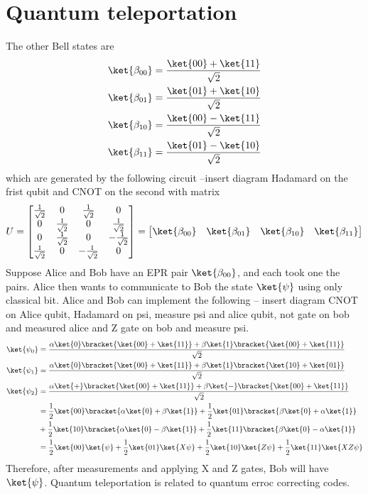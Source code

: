 \section{Quantum teleportation}
The other Bell states are 
\begin{align*}
    \ket{\beta_{00}} &= \dfrac{\ket{00} + \ket{11}}{\sqrt{2}}\\
    \ket{\beta_{01}} &= \dfrac{\ket{01} + \ket{10}}{\sqrt{2}}\\
    \ket{\beta_{10}} &= \dfrac{\ket{00} - \ket{11}}{\sqrt{2}}\\
    \ket{\beta_{11}} &= \dfrac{\ket{01} - \ket{10}}{\sqrt{2}}
\end{align*}
which are generated by the following circuit --insert diagram Hadamard on the frist qubit and CNOT on the second 
with matrix 
\begin{equation*}
    U = \begin{bmatrix}
        \frac{1}{\sqrt{2}} & 0 & \frac{1}{\sqrt{2}} & 0\\
        0 & \frac{1}{\sqrt{2}} & 0 & \frac{1}{\sqrt{2}} \\
        0 & \frac{1}{\sqrt{2}} & 0 & -\frac{1}{\sqrt{2}} \\
        \frac{1}{\sqrt{2}} & 0 & - \frac{1}{\sqrt{2}} & 0
    \end{bmatrix} = \begin{bmatrix}
        \ket{\beta_{00}} & \ket{\beta_{01}} & \ket{\beta_{10}} & \ket{\beta_{11}}
    \end{bmatrix}
\end{equation*}
Suppose Alice and Bob have an EPR pair \(\ket{\beta_{00}}\), and each took one the pairs. Alice then wants to communicate to Bob the state \(\ket{\psi}\) using only classical bit. Alice and Bob can implement the following -- insert diagram CNOT on Alice qubit, Hadamard on psi, measure psi and alice qubit, not gate on bob and measured alice and Z gate on bob and measure psi. 
\begin{align*}
    \ket{\psi_0} &= \dfrac{\alpha \ket{0} \bracket{\ket{00} + \ket{11}} +  \beta \ket{1} \bracket{\ket{00} + \ket{11}}}{\sqrt{2}}\\
    \ket{\psi_1} &= \dfrac{\alpha \ket{0} \bracket{\ket{00} + \ket{11}} +  \beta \ket{1} \bracket{\ket{10} + \ket{01}}}{\sqrt{2}}\\
    \ket{\psi_2} &= \dfrac{\alpha \ket{+} \bracket{\ket{00} + \ket{11}} +  \beta \ket{-} \bracket{\ket{00} + \ket{11}}}{\sqrt{2}}\\
    &=  \dfrac{1}{2} \ket{00} \bracket{\alpha \ket{0} + \beta \ket{1}} + \dfrac{1}{2} \ket{01} \bracket{\beta \ket{0} + \alpha \ket{1}} \\ \quad &+ \dfrac{1}{2} \ket{10} \bracket{\alpha \ket{0} - \beta \ket{1}} + \dfrac{1}{2} \ket{11} \bracket{\beta \ket{0} - \alpha \ket{1}}\\
    &= \dfrac{1}{2} \ket{00}  \ket{\psi} + \dfrac{1}{2} \ket{01}  \ket{X\psi} + \dfrac{1}{2} \ket{10}  \ket{Z\psi} + \dfrac{1}{2} \ket{11}  \ket{XZ\psi}
\end{align*}
Therefore, after measurements and applying X and Z gates, Bob will have \(\ket{\psi}\). Quantum teleportation is related to quantum erroc correcting codes.

